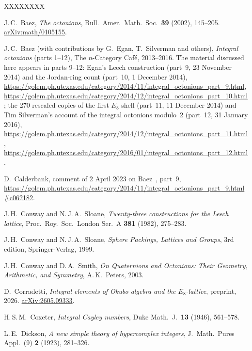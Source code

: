 \documentclass[twoside,english]{paper}
\numberwithin{equation}{section}
\numberwithin{figure}{section}
\theoremstyle{definition}
\theoremstyle{remark}
\begin{document}
\begin{thebibliography}{XXXXXXXX}

J.\,C.~Baez,
\emph{The octonions},
Bull.\ Amer.\ Math.\ Soc.\ \textbf{39} (2002), 145--205.
\href{https://arxiv.org/abs/math/0105155}{arXiv:math/0105155}.

J.\,C.~Baez (with contributions by G.~Egan, T.~Silverman and others),
\emph{Integral octonions} (parts 1--12),
The $n$-Category Caf\'e, 2013--2016.
The material discussed here appears in parts 9--12: Egan's Leech
construction (part~9, 23 November 2014) and the Jordan-ring count
(part~10, 1 December 2014),
\url{https://golem.ph.utexas.edu/category/2014/11/integral_octonions_part_9.html},
\url{https://golem.ph.utexas.edu/category/2014/12/integral_octonions_part_10.html};
the 270 rescaled copies of the first $E_8$ shell (part~11, 11 December
2014) and Tim Silverman's account of the integral octonions modulo~2
(part~12, 31 January 2016),
\url{https://golem.ph.utexas.edu/category/2014/12/integral_octonions_part_11.html},
\url{https://golem.ph.utexas.edu/category/2016/01/integral_octonions_part_12.html}.

D.~Calderbank,
comment of 2 April 2023 on Baez~\cite{Baez2014}, part~9,
\url{https://golem.ph.utexas.edu/category/2014/11/integral_octonions_part_9.html#c062182}.

J.\,H.~Conway and N.\,J.\,A.~Sloane,
\emph{Twenty-three constructions for the Leech lattice},
Proc.\ Roy.\ Soc.\ London Ser.\ A \textbf{381} (1982), 275--283.

J.\,H.~Conway and N.\,J.\,A.~Sloane,
\emph{Sphere Packings, Lattices and Groups},
3rd edition, Springer-Verlag, 1999.

J.\,H.~Conway and D.\,A.~Smith,
\emph{On Quaternions and Octonions: Their Geometry, Arithmetic, and
Symmetry},
A.\,K.~Peters, 2003.

D.~Corradetti,
\emph{Integral elements of Okubo algebra and the $E_8$-lattice},
preprint, 2026.
\href{https://arxiv.org/abs/2605.09333}{arXiv:2605.09333}.

H.\,S.\,M.~Coxeter,
\emph{Integral Cayley numbers},
Duke Math.\ J.\ \textbf{13} (1946), 561--578.

L.\,E.~Dickson,
\emph{A new simple theory of hypercomplex integers},
J.~Math.\ Pures Appl.\ (9) \textbf{2} (1923), 281--326.


\end{thebibliography}
\end{document}
